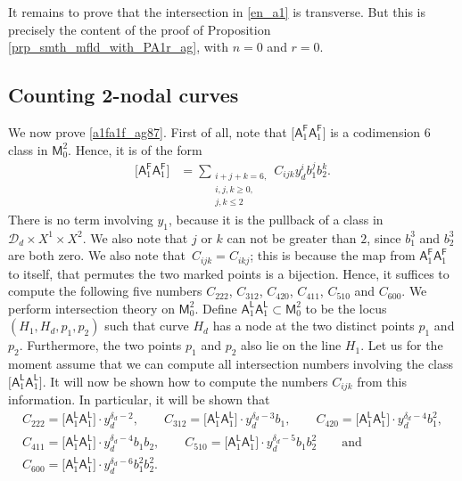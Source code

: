 \documentclass[pdftex]{sigma}
\numberwithin{equation}{section}
\begin{document}
It remains to prove that the intersection in \eqref{en_a1} is transverse.
But this is precisely the content of the proof of Proposition \ref{prp_smth_mfld_with_PA1r_ag},
with $n = 0$ and $r = 0$.


\subsection[Counting 2-nodal curves]{Counting $\boldsymbol{ 2}$-nodal curves}
\label{binodal_comp}

We now prove \eqref{a1fa1f_ag87}. First of all, note that $\bigl[\mathsf{A}_1^{\mathsf{F}} \mathsf{A}_1^{\mathsf{F}}\bigr]$
is a codimension $6$ class in $\mathsf{M}^2_0$. Hence, it is of the form
\begin{align}
\bigl[\mathsf{A}_1^{\mathsf{F}} \mathsf{A}_1^{\mathsf{F}}\bigr] & = \sum_{\substack{i+j+k= 6, \\ i, j, k \geq 0, \\
j , k \leq 2}}C_{ijk} y_d^{i} b_1^j b_2^k.\label{gijk_defn}
\end{align}
There is no term involving $y_1$, because it is the pullback of a class in $\mathcal{D}_d \times X^1 \times X^2$.
We also note that $j$ or $k$ can not be greater than $2$, since $b_1^3$ and $b_2^3$ are both zero.
We also note that~${C_{ijk} = C_{ikj}}$; this is because the map from
$\mathsf{A}_1^{\mathsf{F}} \mathsf{A}_1^{\mathsf{F}}$ to itself, that permutes the two marked points is a bijection.
Hence, it suffices to compute the following five numbers
$C_{222}$, $ C_{312}$, $ C_{420}$, $ C_{411}$, $ C_{510}$ and $ C_{600}$.
We perform intersection theory on $\mathsf{M}^2_0$. Define
$\mathsf{A}_1^{\mathsf{L}} \mathsf{A}_1^{\mathsf{L}} \subset \mathsf{M}^2_0$ to be the locus~${(H_1, H_d, p_1, p_2)}$
such that curve $H_d$ has a node at the two distinct points $p_1$ and $p_2$. Furthermore, the two points $p_1$
and $p_2$ also lie on the line $H_1$. Let us for the moment assume that we can compute all intersection
numbers involving the class $\bigl[\mathsf{A}_1^{\mathsf{L}} \mathsf{A}_1^{\mathsf{L}}\bigr]$. It will now be shown how to
compute the numbers $C_{ijk}$ from this information. In particular, it will be shown that
\begin{gather}
C_{222} = \bigl[\mathsf{A}_1^{\mathsf{L}} \mathsf{A}_1^{\mathsf{L}}\bigr]\cdot y_d^{\delta_d-2},
\qquad C_{312}= \bigl[\mathsf{A}_1^{\mathsf{L}} \mathsf{A}_1^{\mathsf{L}}\bigr]\cdot y_d^{\delta_d-3}b_1, \qquad
C_{420} = \bigl[\mathsf{A}_1^{\mathsf{L}} \mathsf{A}_1^{\mathsf{L}}\bigr]\cdot y_d^{\delta_d-4}b_1^2, \nonumber \\
C_{411} = \bigl[\mathsf{A}_1^{\mathsf{L}} \mathsf{A}_1^{\mathsf{L}}\bigr]\cdot y_d^{\delta_d-4}b_1 b_2, \qquad
C_{510} = \bigl[\mathsf{A}_1^{\mathsf{L}} \mathsf{A}_1^{\mathsf{L}}\bigr]\cdot y_d^{\delta_d-5}b_1b_2^2
\qquad \text{and}\nonumber\\
C_{600} = \bigl[\mathsf{A}_1^{\mathsf{L}} \mathsf{A}_1^{\mathsf{L}}\bigr]\cdot y_d^{\delta_d-6}b_1^2b_2^2. \label{Cijk}
\end{gather}
\end{document}
